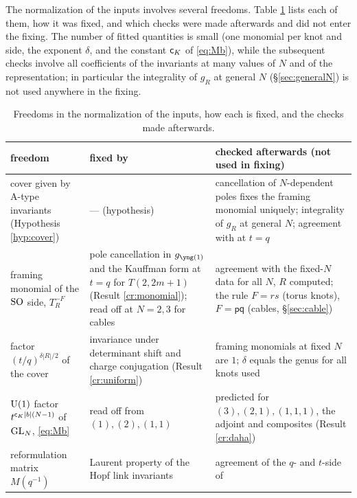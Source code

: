 The normalization of the inputs involves several freedoms. Table \ref{tab:norm} lists each of them, how it was fixed, and which checks were made afterwards and did not enter the fixing. The number of fitted quantities is small (one monomial per knot and side, the exponent $\delta$, and the constant $\mathsf{c}_K$ of \eqref{eq:Mb}), while the subsequent checks involve all coefficients of the invariants at many values of $N$ and of the representation; in particular the integrality of $g_R$ at general $N$ (\S\ref{sec:generalN}) is not used anywhere in the fixing.
\begin{table}[htbp]
\centering
\small
\caption{Freedoms in the normalization of the inputs, how each is fixed, and the checks made afterwards.}\label{tab:norm}
\begin{tabular}{>{\raggedright\arraybackslash}p{3.6cm}>{\raggedright\arraybackslash}p{5.2cm}>{\raggedright\arraybackslash}p{5.8cm}}
\toprule
freedom & fixed by & checked afterwards (not used in fixing) \\
\midrule
\addlinespace
cover given by A-type invariants (Hypothesis \ref{hyp:cover}) & --- (hypothesis) & cancellation of $N$-dependent poles fixes the framing monomial uniquely; integrality of $g_R$ at general $N$; agreement with \cite{Marino09} at $t = q$ \\
\addlinespace
framing monomial of the $\mathrm{SO}$ side, $T_R^{-F}$ & pole cancellation in $g_{\yone}$ and the Kauffman form at $t = q$ for $T(2,2m+1)$ (Result \ref{cr:monomial}); read off at $N = 2, 3$ for cables & agreement with the fixed-$N$ data for all $N$, $R$ computed; the rule $F = rs$ (torus knots), $F = \mathsf{p}\mathsf{q}$ (cables, \S\ref{sec:cable}) \\
\addlinespace
factor $(t/q)^{\delta|R|/2}$ of the cover & invariance under determinant shift and charge conjugation (Result \ref{cr:uniform}) & framing monomials at fixed $N$ are $1$; $\delta$ equals the genus for all knots used \\
\addlinespace
$\mathrm{U}(1)$ factor $t^{\mathsf{c}_K|b|(N-1)}$ of $\mathrm{GL}_N$, \eqref{eq:Mb} & read off from $(1), (2), (1,1)$ & predicted for $(3), (2,1), (1,1,1)$, the adjoint and composites (Result \ref{cr:daha}) \\
\addlinespace
reformulation matrix $M(q^{-1})$ & Laurent property of the Hopf link invariants & agreement of the $q$- and $t$-side of \cite{KN17} \\
\bottomrule
\end{tabular}
\end{table}

